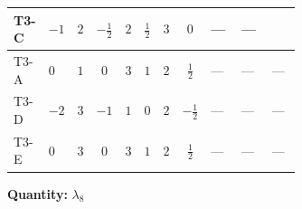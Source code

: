 \documentclass[8pt]{article}
\begin{document}
\begin{landscape}
\begin{longtable}{@{}llcccccc >{\raggedright\arraybackslash}p{0.21\linewidth} >{\raggedright\arraybackslash}p{0.21\linewidth} >{\raggedright\arraybackslash}p{0.21\linewidth}@{}}
\midrule
T3-C & $-1$ & $2$ & $-\frac{1}{2}$ & $2$ & $\frac{1}{2}$ & $3$ & $0$ & --- & --- & \scriptsize\adjustbox{max width=\linewidth}{$\begin{gathered} +4 {\lambda_{7}} \left({\lambda_{9}}\right)^{*}\end{gathered}$} \\
\midrule
T3-A & $0$ & $1$ & $0$ & $3$ & $1$ & $2$ & $\frac{1}{2}$ & --- & --- & --- \\
\midrule
T3-D & $-2$ & $3$ & $-1$ & $1$ & $0$ & $2$ & $-\frac{1}{2}$ & --- & --- & --- \\
\midrule
T3-E & $0$ & $3$ & $0$ & $3$ & $1$ & $2$ & $\frac{1}{2}$ & --- & --- & --- \\
\midrule
\bottomrule
\end{longtable}
\clearpage
\noindent\textbf{Quantity: }$\lambda_{8}$\par\smallskip

\end{landscape}
\end{document}
